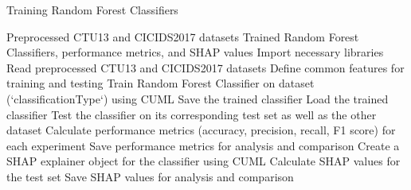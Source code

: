 \begin{algorithm}[ht]
    \caption{Training Random Forest Classifiers}\label{alg:trainRandomForest}
    \begin{algorithmic}[1]
    \Require%
    Preprocessed CTU13 and CICIDS2017 datasets
    \Ensure%
    Trained Random Forest Classifiers, performance metrics, and SHAP values
    \State%
    Import necessary libraries
    \State%
    Read preprocessed CTU13 and CICIDS2017 datasets
    \State%
    Define common features for training and testing
        \State%
        Train Random Forest Classifier on dataset (`classificationType`) using CUML
        \State%
        Save the trained classifier
    \EndFunction%
        \State%
        Load the trained classifier
        \State%
        Test the classifier on its corresponding test set as well as the other dataset
        \State%
        Calculate performance metrics (accuracy, precision, recall, F1 score) for each experiment
        \State%
        Save performance metrics for analysis and comparison
        \State%
        Create a SHAP explainer object for the classifier using CUML
        \State%
        Calculate SHAP values for the test set
        \State%
        Save SHAP values for analysis and comparison
    \EndFunction%
            \State%
            \State%
            \State%
        \EndIf%
    \EndFor%
        \State%
    \EndFor%
    \end{algorithmic}
\end{algorithm}

